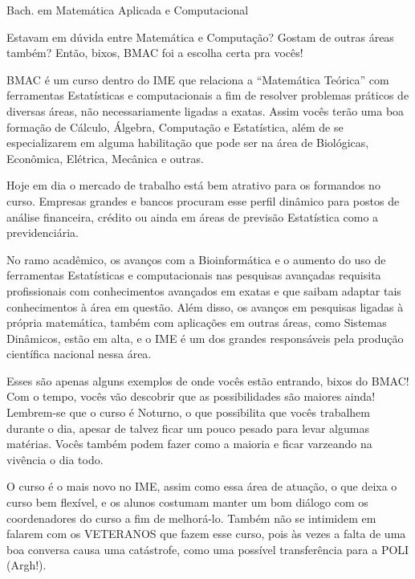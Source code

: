 \begin{subsecao}{Bach. em Matemática Aplicada e Computacional}

Estavam em dúvida entre Matemática e Computação? Gostam de outras áreas também?
Então, bixos, BMAC foi a escolha certa pra vocês!

BMAC é um curso dentro do IME que relaciona a ``Matemática Teórica'' com
ferramentas Estatísticas e computacionais a fim de resolver problemas práticos
de diversas áreas, não necessariamente ligadas a exatas. Assim vocês terão uma boa
formação de Cálculo, Álgebra, Computação e Estatística, além de se especializarem
em alguma habilitação que pode ser na área de Biológicas, Econômica, Elétrica,
Mecânica e outras.

Hoje em dia o mercado de trabalho está bem atrativo para os formandos no curso.
Empresas grandes e bancos procuram esse perfil dinâmico para postos de análise
financeira, crédito ou ainda em áreas de previsão Estatística como a
previdenciária.

No ramo acadêmico, os avanços com a Bioinformática e o aumento do uso de
ferramentas Estatísticas e computacionais nas pesquisas avançadas requisita
profissionais com conhecimentos avançados em exatas e que saibam adaptar tais
conhecimentos à área em questão. Além disso, os avanços em pesquisas ligadas à
própria matemática, também com aplicações em outras áreas, como Sistemas
Dinâmicos, estão em alta, e o IME é um dos grandes responsáveis pela produção
científica nacional nessa área.

Esses são apenas alguns exemplos de onde vocês estão entrando, bixos do BMAC! Com o tempo, vocês vão
descobrir que as possibilidades são maiores ainda! Lembrem-se que o
curso é Noturno, o que possibilita que vocês trabalhem durante o dia, apesar de talvez
ficar um pouco pesado para levar algumas matérias. Vocês também podem fazer como
a maioria e ficar varzeando na vivência o dia todo.

O curso é o mais novo no IME, assim como essa área de atuação, o que
deixa o curso bem flexível, e os alunos costumam manter um bom diálogo
com os coordenadores do curso a fim de melhorá-lo. Também não se
intimidem em falarem com os VETERANOS que fazem esse curso, pois às
vezes a falta de uma boa conversa causa uma catástrofe, como uma
possível transferência para a POLI (Argh!).

\end{subsecao}
